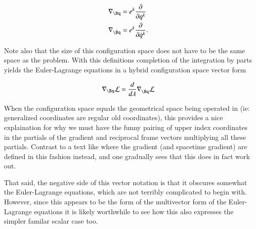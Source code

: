 \documentclass{article}
\newcommand{\LL}[0]{\mathcal{L}}
\newcommand{\qdot}[0]{\dot{q}}
\newcommand{\PD}[2]{\frac{\partial {#2}}{\partial {#1}}}
\newcommand{\grad}[0]{\nabla}
\begin{document}
\begin{align}
\grad_{\Bq} &= e^k \PD{q^k}{} \\
\grad_{\dot{\Bq}} &= e^k \PD{\qdot^k}{}.
\end{align}

Note also that the size of this configuration space does not have to be the same space as the problem.  With this definitions completion of the integration
by parts yields the Euler-Lagrange equations in a hybrid configuration space vector form

\begin{align}
\grad_{\Bq} \LL = \frac{d}{d\lambda} \grad_{\dot{\Bq}} \LL
\end{align}

When the configuration space equals the geometrical space being operated in (ie: generalized coordinates are regular old coordinates), this 
provides a nice explaination for why we must have the funny pairing of upper index coordinates in the partials of the gradient and reciprocal frame
vectors multiplying all these partials.  Contrast to a text like \cite{doran2003gap} where the gradient (and spacetime gradient) are defined in this
fashion instead, and one gradually sees that this does in fact work out.

That said, the negative side of this vector notation is that 
it obscures somewhat the Euler-Lagrange equations, which are not terribly complicated to begin with.  However, since this appears to be the form
of the multivector form of the Euler-Lagrange equations it is likely worthwhile to see how this also expresses the simpler familar scalar case too.

\end{document}
